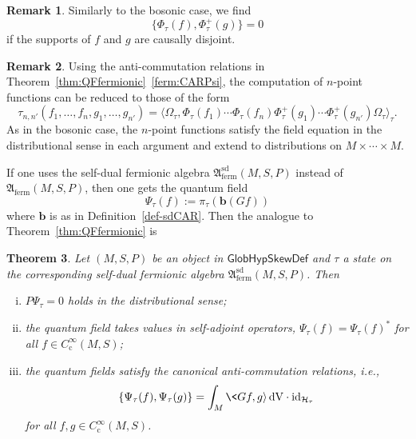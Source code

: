 \documentclass[a4paper,11pt]{amsart}
\newtheorem{thm}{Theorem}[section]
\theoremstyle{definition}
\newtheorem{rem}[thm]{Remark}
\begin{document}
\begin{rem}
Similarly to the bosonic case, we find
$$
\{\Phi_\tau(f),\Phi_\tau^+(g)\}=0
$$
if the supports of $f$ and $g$ are causally disjoint.
\end{rem}

\begin{rem}
Using the anti-commutation relations in Theorem~\ref{thm:QFfermionic}~\eqref{ferm:CARPsi}, the computation of $n$-point functions can be reduced to those of the form
$$
\tau_{n,n'}(f_1,\ldots,f_n,g_1,\ldots,g_{n'}) = {\langle}\Omega_\tau,\Phi_\tau(f_1)\cdots\Phi_\tau(f_n)\Phi_\tau^+(g_1)\cdots\Phi_\tau^+(g_{n'})\Omega_\tau{\rangle}_\tau .
$$
As in the bosonic case, the $n$-point functions satisfy the field equation in the distributional sense in each argument and extend to distributions on $M\times\cdots\times M$.
\end{rem}

If one uses the self-dual fermionic algebra ${\mathfrak{A}_\mathrm{ferm}^\mathrm{sd}}(M,S,P)$ instead of ${\mathfrak{A}_\mathrm{ferm}}(M,S,P)$, then one gets the quantum field
$$
\Psi_\tau(f) := \pi_\tau({\mathbf{b}}(Gf))
$$
where ${\mathbf{b}}$ is as in Definition~\ref{def-sdCAR}.
Then the analogue to Theorem~\ref{thm:QFfermionic} is

\begin{thm}
Let $(M,S,P)$ be an object in ${\mathsf{GlobHypSkewDef}}$ and $\tau$ a state on the corresponding self-dual fermionic algebra ${\mathfrak{A}_\mathrm{ferm}^\mathrm{sd}}(M,S,P)$.
Then
\begin{enumerate}[(i)]
\item
$P\Psi_\tau=0$ holds in the distributional sense;
\item
the quantum field takes values in self-adjoint operators, $\Psi_\tau(f) = \Psi_\tau(f)^*$ for all $f\in{C^\infty_\mathrm{c}}(M,S)$;
\item
the quantum fields satisfy the canonical anti-commutation relations, i.e., 
$$
\{\Psi_\tau(f),\Psi_\tau(g)\} 
=
\int_M \<Gf,g{\rangle}{\,\mathrm{dV}} \cdot {\mathrm{id}}_{{\mathcal{H}}_\tau}
$$
for all $f,g\in{C^\infty_\mathrm{c}}(M,S)$.
\end{enumerate}
\end{thm}
\end{document}
